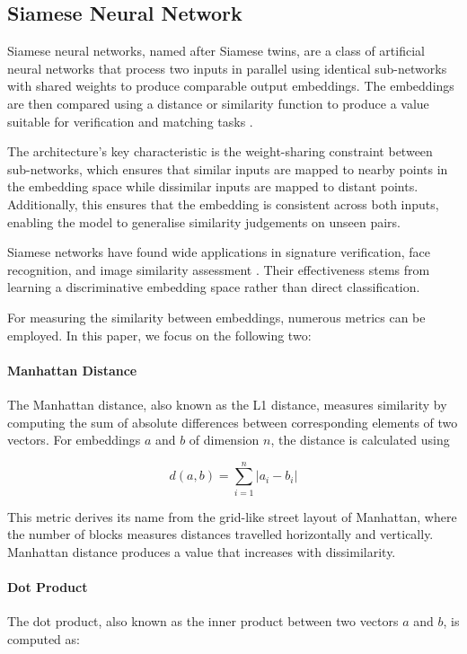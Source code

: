 \subsection{Siamese Neural Network} \label{ML:SiameseNetwork}
Siamese neural networks, named after Siamese twins, are a class of artificial neural networks that process two inputs in parallel using identical sub-networks with shared weights to produce comparable output embeddings. The embeddings are then compared using a distance or similarity function to produce a value suitable for verification and matching tasks \cite{SiameseModelIntro}.

The architecture's key characteristic is the weight-sharing constraint between sub-networks, which ensures that similar inputs are mapped to nearby points in the embedding space while dissimilar inputs are mapped to distant points. Additionally, this ensures that the embedding is consistent across both inputs, enabling the model to generalise similarity judgements on unseen pairs.

Siamese networks have found wide applications in signature verification, face recognition, and image similarity assessment \cite{SiameseModelSignatureVerification, SiameseFacialRecognition, SiameseImageSimilarity} . Their effectiveness stems from learning a discriminative embedding space rather than direct classification.

For measuring the similarity between embeddings, numerous metrics can be employed. In this paper, we focus on the following two:

\paragraph{Manhattan Distance}
The Manhattan distance, also known as the L1 distance, measures similarity by computing the sum of absolute differences between corresponding elements of two vectors. For embeddings $a$ and $b$ of dimension $n$, the distance is calculated using

$$d(a, b) = \sum^n_{i=1}|a_i - b_i|$$

This metric derives its name from the grid-like street layout of Manhattan, where the number of blocks measures distances travelled horizontally and vertically. Manhattan distance produces a value that increases with dissimilarity.

\paragraph{Dot Product} \label{METRIC:DotProduct}
The dot product, also known as the inner product between two vectors $a$ and $b$, is computed as:

